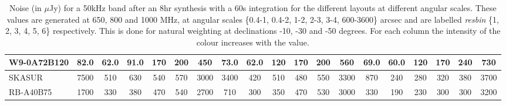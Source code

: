\begin{table}[!htp]
{{\begin{tabular}{|lcccccc||cccccc||cccccc|}
W9-0A72B120 & 82.0 \cellcolor{blue!18.02} & 62.0 \cellcolor{red!18.37} & 91.0 \cellcolor{green!18.46} & 170 \cellcolor{orange!20.15} & 200 \cellcolor{purple!20.15} & 450 \cellcolor{blue!18.65} & 73.0 \cellcolor{blue!18.05} & 62.0 \cellcolor{red!18.58} & 120 \cellcolor{green!20.05} & 170 \cellcolor{orange!20.55} & 200 \cellcolor{purple!19.17} & 560 \cellcolor{blue!18.45} & 69.0 \cellcolor{blue!18.16} & 60.0 \cellcolor{red!18.91} & 120 \cellcolor{green!20.47} & 170 \cellcolor{orange!22.94} & 240 \cellcolor{purple!29.05} & 730 \cellcolor{blue!18.56}\\ \hline 
SKASUR & 7500 \cellcolor{blue!60.00} & 510 \cellcolor{red!60.00} & 630 \cellcolor{green!60.00} & 540 \cellcolor{orange!60.00} & 570 \cellcolor{purple!60.00} & 3000 \cellcolor{blue!60.00} & 3400 \cellcolor{blue!60.00} & 420 \cellcolor{red!60.00} & 510 \cellcolor{green!60.00} & 480 \cellcolor{orange!60.00} & 550 \cellcolor{purple!60.00} & 3300 \cellcolor{blue!60.00} & 870 \cellcolor{blue!60.00} & 240 \cellcolor{red!60.00} & 280 \cellcolor{green!60.00} & 320 \cellcolor{orange!60.00} & 380 \cellcolor{purple!60.00} & 3700 \cellcolor{blue!60.00}\\ \hline 
RB-A40B75 & 1700 \cellcolor{blue!27.17} & 330 \cellcolor{red!43.27} & 380 \cellcolor{green!40.73} & 470 \cellcolor{orange!52.46} & 540 \cellcolor{purple!56.77} & 2700 \cellcolor{blue!55.14} & 710 \cellcolor{blue!26.08} & 300 \cellcolor{red!46.12} & 350 \cellcolor{green!43.61} & 470 \cellcolor{orange!58.73} & 530 \cellcolor{purple!57.67} & 3000 \cellcolor{blue!55.45} & 330 \cellcolor{blue!31.79} & 190 \cellcolor{red!48.59} & 230 \cellcolor{green!47.65} & 300 \cellcolor{orange!55.06} & 300 \cellcolor{purple!42.32} & 3200 \cellcolor{blue!53.02}\tabularnewline \hline 
\end{tabular}}\hfill 

\caption{Noise (in $\mu$Jy) for a 50kHz band after an 8hr synthesis with a 60s integration for the different layouts at different angular scales. These values are generated at 650, 800 and 1000 MHz, at angular scales \{0.4-1, 0.4-2, 1-2, 2-3, 3-4, 600-3600\} arcsec and are labelled {\it resbin} \{1, 2, 3, 4, 5, 6\} respectively. This is done for natural weighting at declinations -10, -30 and -50 degrees. For each column the intensity of the colour increases with the value.}\label{tab:noise50k-new}}
 \end{table}